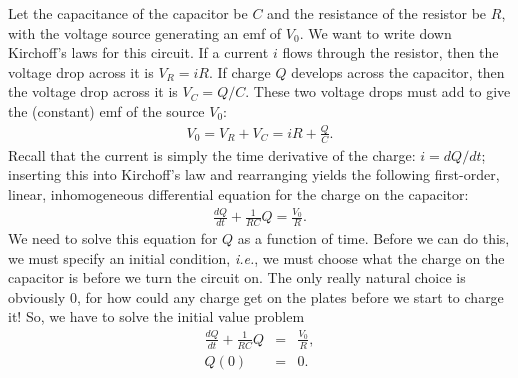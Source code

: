 Let the capacitance of the capacitor be $C$ and the resistance of the 
resistor be $R$, with the voltage source generating an emf of $V_0$. We 
want to write down Kirchoff's laws for this circuit. If a current $i$ flows 
through the resistor, then the voltage drop across it is $V_R = iR$. If 
charge $Q$ develops across the capacitor, then the voltage drop across it 
is $V_C=Q/C$. These two voltage drops must add to give the (constant)
emf of the source $V_0$:
\begin{eqnarray*}
V_0=V_R+V_C=iR+\frac{Q}{C}.
\end{eqnarray*}
Recall that the current is simply the time derivative of the charge:
$i = dQ/dt$; inserting this into Kirchoff's law and rearranging 
yields the following first-order, linear, inhomogeneous differential 
equation for the charge on the capacitor:
\begin{eqnarray*}
\frac{dQ}{dt} + \frac{1}{RC}Q = \frac{V_0}{R}.
\end{eqnarray*}
We need to solve this equation for $Q$ as a function of time. Before we
can do this, we must specify an initial condition, {\it i.e.}, we must choose 
what the charge on the capacitor is before we turn the circuit on. The only 
really natural choice is obviously 0, for how could any charge get on the 
plates before we start to charge it! So, we have to solve the initial 
value problem
\begin{eqnarray}
\frac{dQ}{dt} + \frac{1}{RC}Q &=& \frac{V_0}{R},   \label{eq:RC:ode1}\\
Q(0) & = & 0. \nonumber
\end{eqnarray}

